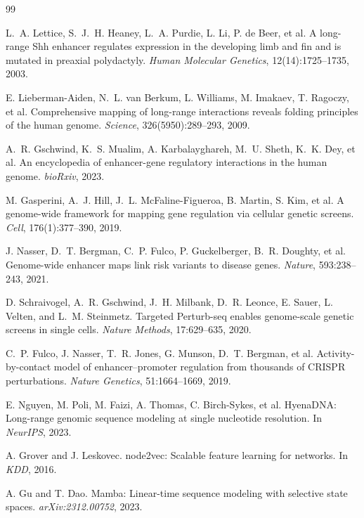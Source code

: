 {\small
\begin{thebibliography}{99}

L.~A. Lettice, S.~J.~H. Heaney, L.~A. Purdie, L. Li, P. de Beer, et al.
A long-range Shh enhancer regulates expression in the developing limb and fin and is mutated in preaxial polydactyly.
\emph{Human Molecular Genetics}, 12(14):1725--1735, 2003.

E. Lieberman-Aiden, N.~L. van Berkum, L. Williams, M. Imakaev, T. Ragoczy, et al.
Comprehensive mapping of long-range interactions reveals folding principles of the human genome.
\emph{Science}, 326(5950):289--293, 2009.

A.~R. Gschwind, K.~S. Mualim, A. Karbalayghareh, M.~U. Sheth, K.~K. Dey, et al.
An encyclopedia of enhancer-gene regulatory interactions in the human genome.
\emph{bioRxiv}, 2023.

M. Gasperini, A.~J. Hill, J.~L. McFaline-Figueroa, B. Martin, S. Kim, et al.
A genome-wide framework for mapping gene regulation via cellular genetic screens.
\emph{Cell}, 176(1):377--390, 2019.

J. Nasser, D.~T. Bergman, C.~P. Fulco, P. Guckelberger, B.~R. Doughty, et al.
Genome-wide enhancer maps link risk variants to disease genes.
\emph{Nature}, 593:238--243, 2021.

D. Schraivogel, A.~R. Gschwind, J.~H. Milbank, D.~R. Leonce, E. Sauer, L. Velten, and L.~M. Steinmetz.
Targeted Perturb-seq enables genome-scale genetic screens in single cells.
\emph{Nature Methods}, 17:629--635, 2020.

C.~P. Fulco, J. Nasser, T.~R. Jones, G. Munson, D.~T. Bergman, et al.
Activity-by-contact model of enhancer--promoter regulation from thousands of CRISPR perturbations.
\emph{Nature Genetics}, 51:1664--1669, 2019.

E. Nguyen, M. Poli, M. Faizi, A. Thomas, C. Birch-Sykes, et al.
HyenaDNA: Long-range genomic sequence modeling at single nucleotide resolution.
In \emph{NeurIPS}, 2023.

A. Grover and J. Leskovec.
node2vec: Scalable feature learning for networks.
In \emph{KDD}, 2016.

A. Gu and T. Dao.
Mamba: Linear-time sequence modeling with selective state spaces.
\emph{arXiv:2312.00752}, 2023.


\end{thebibliography}}
